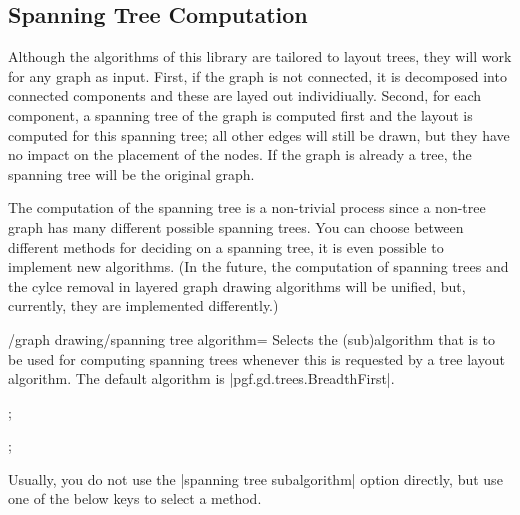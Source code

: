 \subsection{Spanning Tree Computation}

Although the algorithms of this library are tailored to layout trees,
they will work for any graph as input. First, if the graph is not
connected, it is decomposed into connected components and these are
layed out individiually. Second, for each component, a spanning tree of
the graph is computed first and the layout is computed for this
spanning tree; all other edges will still be drawn, but they have no
impact on the placement of the nodes. If the graph is already a tree,
the spanning tree will be the original graph.

The computation of the spanning tree is a non-trivial process since
a non-tree graph has many different possible spanning trees. You can
choose between different methods for deciding on a spanning tree, it
is even possible to implement new algorithms. (In the future, the
computation of spanning trees and the cylce removal in layered graph
drawing algorithms will be unified, but, currently, they are
implemented differently.) 

\begin{key}{/graph drawing/spanning tree algorithm=}
  Selects the (sub)algorithm that is to be used for computing spanning
  trees whenever this is requested by a tree layout algorithm. The
  default algorithm is |pgf.gd.trees.BreadthFirst|.
\begin{codeexample}[]
\tikz {};   
\end{codeexample}
\begin{codeexample}[]
\tikz {};   
\end{codeexample} 
\end{key}

Usually, you do not use the |spanning tree subalgorithm| option directly,
but use one of the below keys to select a method.

